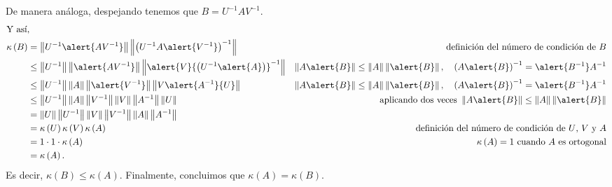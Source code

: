 \documentclass[
	spanish,
	8pt,
	utf8,
	xcolor=table,
	handout,
	aspectratio=169,
	professionalfonts,
	mathserif,
	leqno,
]{beamer}
\begin{document}
\begin{frame}
	\begin{solution}
		De manera análoga, despejando tenemos que $B={U}^{-1}{A}{V}^{-1}$.
		\begin{align*}
			\shortintertext{Y así,}
			\kappa\left(B\right)                  & =
			\left\|
			{U}^{-1}\alert{{A}{V}^{-1}}
			\right\|
			\left\|
			{\left({U}^{-1}{A}\alert{{V}^{-1}}\right)}^{-1}
			\right\|                              &
			\text{definición del número de condición de $B$}            \\
			                                      & \leq
			\left\|
			{U}^{-1}
			\right\|
			\left\|
			\alert{AV^{-1}}
			\right\|
			\left\|
			\alert{{V}}{\left(U^{-1}\alert{A}\right)}^{-1}
			\right\|                              &
			\left\|A\alert{B}\right\|\leq
			\left\|A\right\|\left\|\alert{B}\right\|,\quad
			{\left(A\alert{B}\right)}^{-1}=\alert{B^{-1}}A^{-1}         \\
			                                      & \leq
			\left\|{U}^{-1}\right\|
			\left\|A\right\|
			\left\|
			\alert{{V}^{-1}}
			\right\|
			\left\|{V}\alert{{A}^{-1}}{U}\right\| &
			\left\|A\alert{B}\right\|\leq
			\left\|A\right\|\left\|\alert{B}\right\|,\quad
			{\left(A\alert{B}\right)}^{-1}=\alert{B^{-1}}A^{-1}         \\
			                                      & \leq
			\left\|{U}^{-1}\right\|
			\left\|A\right\|
			\left\|{V}^{-1}\right\|
			\left\|V\right\|
			\left\|{A}^{-1}\right\|
			\left\|U\right\|                      &
			\text{aplicando dos veces }
			\left\|A\alert{B}\right\|\leq
			\left\|A\right\|\left\|\alert{B}\right\|                    \\
			                                      & =
			\left\|U\right\|
			\left\|{U}^{-1}\right\|
			\left\|V\right\|
			\left\|{V}^{-1}\right\|
			\left\|A\right\|
			\left\|{A}^{-1}\right\|               &                     \\
			                                      & =
			\kappa\left(U\right)
			\kappa\left(V\right)
			\kappa\left(A\right)                  &
			\text{definición del número de condición de $U$, $V$ y $A$} \\
			                                      & =
			1\cdot 1\cdot\kappa\left(A\right)     &
			\text{$\kappa\left(A\right)=1$ cuando $A$ es ortogonal}     \\
			                                      & =
			\kappa\left(A\right).
		\end{align*}
		Es decir, $\kappa\left(B\right)\leq \kappa\left(A\right)$.
		Finalmente, concluimos que $\kappa\left(A\right)=\kappa\left(B\right)$.
	\end{solution}
\end{frame}
\end{document}
